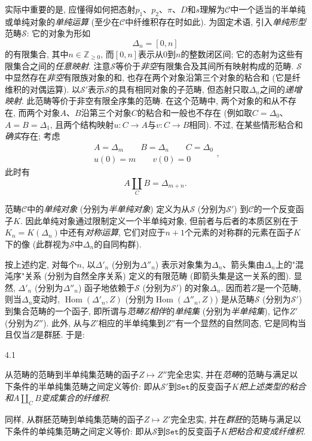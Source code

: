 \par{}实际中重要的是, 应懂得如何把态射\(p_1\)、\(p_2\)、\(\pi \)、\(D\)和\(s\)理解为\(\mathcal {C}\)中一个适当的半单纯或单纯对象的\emph{单纯运算} (至少在\(\mathcal {C}\)中纤维积存在时如此). 为固定术语, 引入\emph{单纯形型}范畴\(\mathcal {S}\): 它的对象为形如\[     \Delta _n     = [0,n]   \]的有限集合, 其中\(n\in \mathbb {Z}_{\geqslant 0}\), 而\([0,n]\)表示从\(0\)到\(n\)的整数闭区间; 它的态射为这些有限集合之间的\emph{任意映射}. 注意\(\mathcal {S}\)等价于\emph{非空}有限集合及其间所有映射构成的范畴. \(\mathcal {S}\)中显然存在\emph{非空}有限族对象的和, 也存在两个对象沿第三个对象的粘合和 (它是纤维积的对偶运算). 以\(\mathcal {S}'\)表示\(\mathcal {S}\)的具有相同对象的子范畴, 但态射只取\(\Delta _n\)之间的\emph{递增映射}. 此范畴等价于非空有限全序集的范畴. 在这个范畴中, 两个对象的和从不存在, 而两个对象\(A\)、\(B\)沿第三个对象\(C\)的粘合和一般也不存在 (例如取\(C=\Delta _0\)、\(A=B=\Delta _1\), 且两个结构映射\(u\colon  C\to  A\)与\(v\colon  C\to  B\)相同). 不过, 在某些情形粘合和\emph{确实}存在; 考虑\[     
\begin {gathered}       A = \Delta _m       \qquad  B = \Delta _n       \qquad  C = \Delta _0     \\u(0) = m       \qquad  v(0) = 0     
\end {gathered},\] 此时有\[     A\coprod _C B     = \Delta _{m+n}.\]
\par{}范畴\(\mathcal {C}\)中的\emph{单纯对象} (分别为\emph{半单纯对象}) 定义为从\(\mathcal {S}\) (分别为\(\mathcal {S}'\)) 到\(\mathcal {C}\)的一个反变函子\(K\). 因此单纯对象通过限制定义一个半单纯对象, 但前者与后者的本质区别在于\(K_n=K(\Delta _n)\)中还有\emph{对称运算}, 它们对应于\(n+1\)个元素的对称群的元素在函子\(K\)下的像 (此群视为\(\mathcal {S}\)中\(\Delta _n\)的自同构群).
\par{}按上述约定, 对每个\(n\), 以\(\Delta '_n\) (分别为\(\Delta ''_n\)) 表示对象集为\(\Delta _n\)、箭头集由\(\Delta _n\)上的"混沌序"关系 (分别为自然全序关系) 定义的有限范畴 (即箭头集是这一关系的图). 显然, \(\Delta '_n\) (分别为\(\Delta ''_n\)) 函子地依赖于\(\mathcal {S}\) (分别为\(\mathcal {S}'\)) 的对象\(\Delta _n\). 因而若\(Z\)是一个范畴, 则当\(\Delta _n\)变动时, \(\operatorname {Hom}(\Delta '_n,Z)\) (分别为\(\operatorname {Hom}(\Delta ''_n,Z)\)) 是从范畴\(\mathcal {S}\) (分别为\(\mathcal {S}'\)) 到集合范畴的一个函子, 即所谓与\emph{范畴\(Z\)相伴}的\emph{单纯集} (分别为\emph{半单纯集}), 记作\(Z'\) (分别为\(Z''\)). 此外, 从与\(Z'\)相应的半单纯集到\(Z''\)有一个显然的自然同态, 它是同构当且仅当\(Z\)是群胚. 于是:
\begin{proposition}{4.1}\label{fga3.iii-4-proposition-4.1}\skipsinglepar
\par{}从范畴的范畴到半单纯集范畴的函子\(Z\mapsto  Z''\)完全忠实, 并在\emph{范畴}的范畴与满足以下条件的半单纯集范畴之间定义等价: 即从\(\mathcal {S}'\)到\(\mathtt {Set}\)的反变函子\(K\)\emph{把上述类型的粘合和\(A\coprod _C B\)变成集合的纤维积}.
\par{}同样, 从群胚范畴到单纯集范畴的函子\(Z\mapsto  Z'\)完全忠实, 并在\emph{群胚}的范畴与满足以下条件的单纯集范畴之间定义等价: 即从\(\mathcal {S}\)到\(\mathtt {Set}\)的反变函子\(K\)\emph{把粘合和变成纤维积}.
\end{proposition}
